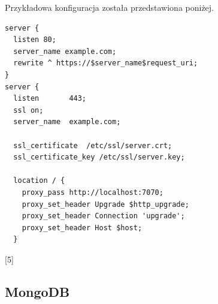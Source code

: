 \documentclass[12pt,a4paper,notitlepage]{article}
\begin{document}
\par Przykładowa konfiguracja została przedstawiona poniżej.

\begin{lstlisting}
server {
  listen 80;
  server_name example.com;
  rewrite ^ https://$server_name$request_uri;
}
server {
  listen       443;
  ssl on;
  server_name  example.com;

  ssl_certificate  /etc/ssl/server.crt;
  ssl_certificate_key /etc/ssl/server.key;

  location / {
    proxy_pass http://localhost:7070;
    proxy_set_header Upgrade $http_upgrade;
    proxy_set_header Connection 'upgrade';
    proxy_set_header Host $host;
  }
\end{lstlisting}
[5]

\subsection{MongoDB}
\end{document}
